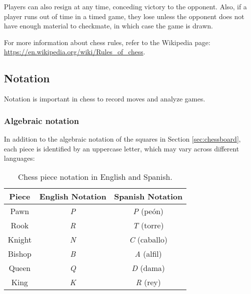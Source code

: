 \noindent Players can also resign at any time, conceding victory to the opponent. Also, if a player runs out of time in a timed game, they lose unless the opponent does not have enough material to checkmate, in which case the game is drawn.

\vspace{1em}

\noindent For more information about chess rules, refer to the Wikipedia page: \url{https://en.wikipedia.org/wiki/Rules_of_chess}.

\newpage

\subsection{Notation}

Notation is important in chess to record moves and analyze games.

\subsubsection{Algebraic notation}

In addition to the algebraic notation of the squares in Section \ref{sec:chessboard}, each piece is identified by an uppercase letter, which may vary across different languages:

\begin{table}[H]
    \centering
    \begin{tabular}{|c|c|c|}
        \hline
        Piece & English Notation & Spanish Notation \\ \hline
        Pawn           & \textit{P}               & \textit{P} (peón)         \\ \hline
        Rook           & \textit{R}               & \textit{T} (torre)        \\ \hline
        Knight         & \textit{N}               & \textit{C} (caballo)      \\ \hline
        Bishop         & \textit{B}               & \textit{A} (alfil)        \\ \hline
        Queen          & \textit{Q}               & \textit{D} (dama)         \\ \hline
        King           & \textit{K}               & \textit{R} (rey)          \\ \hline
    \end{tabular}
    \caption{Chess piece notation in English and Spanish.}
    \label{tab:chess-notation}
\end{table}

